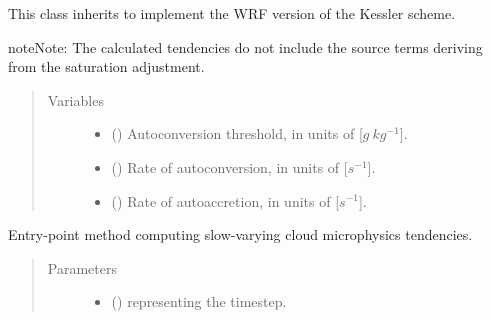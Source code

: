 \documentclass[letterpaper,10pt,english]{sphinxmanual}
\begin{document}

\begin{fulllineitems}
\label{\detokenize{api:parameterizations.slow_tendency_microphysics_kessler_wrf.SlowTendencyMicrophysicsKesslerWRF}}
This class inherits 
to implement the WRF version of the Kessler scheme.

\begin{sphinxadmonition}{note}{Note:}
The calculated tendencies do not include the source terms deriving from the saturation adjustment.
\end{sphinxadmonition}
\begin{quote}\begin{description}
\item[{Variables}] \leavevmode\begin{itemize}
\item {} 
 () \textendash{} Autoconversion threshold, in units of {[}\(g ~ kg^{-1}\){]}.

\item {} 
 () \textendash{} Rate of autoconversion, in units of {[}\(s^{-1}\){]}.

\item {} 
 () \textendash{} Rate of autoaccretion, in units of {[}\(s^{-1}\){]}.

\end{itemize}

\end{description}\end{quote}

\begin{fulllineitems}
\label{\detokenize{api:parameterizations.slow_tendency_microphysics_kessler_wrf.SlowTendencyMicrophysicsKesslerWRF.__call__}}
Entry-point method computing slow-varying cloud microphysics tendencies.
\begin{quote}\begin{description}
\item[{Parameters}] \leavevmode\begin{itemize}
\item {} 
 () \textendash{}  representing the timestep.


\end{itemize}
\end{description}
\end{quote}
\end{fulllineitems}
\end{fulllineitems}
\end{document}
